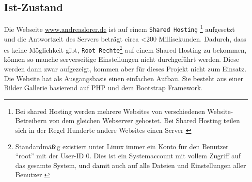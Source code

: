 	\subsection{Ist-Zustand} %
	\label{sub:ist_zustand}
		Die Webseite \url{www.andreaslorer.de}  ist auf einem \texttt{Shared Hosting}
		\footnote{Bei shared Hosting werden mehrere Websites von verschiedenen Website-Betreibern von dem gleichen Webserver gehostet. Bei Shared Hosting teilen sich in der Regel Hunderte andere Websites einen Server \autocite{itWissen}} 
		aufgesetzt und die Antwortzeit des Servers beträgt circa <200 Millisekunden. Dadurch, dass es keine Möglichkeit gibt, \texttt{Root Rechte}\footnote{Standardmäßig existiert unter Linux immer ein Konto für den Benutzer "`root"' mit der User-ID 0. Dies ist ein Systemaccount mit vollem Zugriff auf das gesamte System, und damit auch auf alle Dateien und Einstellungen aller Benutzer \autocite{ubuntu14}} auf einem Shared Hosting zu bekommen, können so manche serverseitige Einstellungen nicht durchgeführt werden. Diese werden dann zwar aufgezeigt, kommen aber für dieses Projekt nicht zum Einsatz.\\
		Die Website hat als Ausgangsbasis einen einfachen Aufbau. Sie besteht aus einer Bilder Gallerie basierend auf PHP und dem Bootstrap Framework.



\pagebreak
%
%
